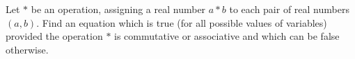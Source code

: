 Let $*$ be an operation, assigning a real number $a * b$ to each pair of real numbers $(a, b)$. Find an equation which is true (for all possible values of variables) provided the operation $*$ is commutative or associative and which can be false otherwise.